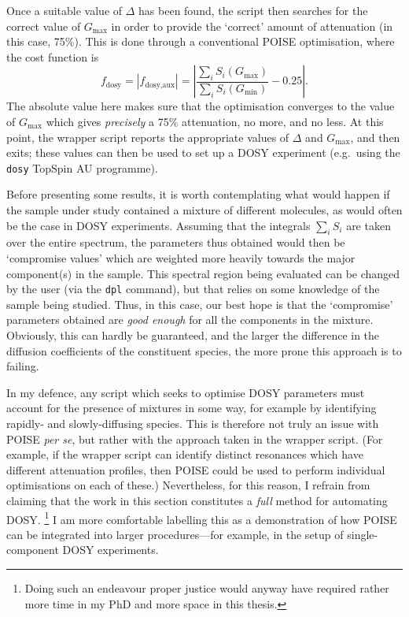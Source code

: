Once a suitable value of $\Delta$ has been found, the script then searches for the correct value of $G_\text{max}$ in order to provide the `correct' amount of attenuation (in this case, 75\%).
This is done through a conventional POISE optimisation, where the cost function is
\begin{equation}
    \label{eq:dosy_cf}
    f_\text{dosy} = |f_\text{dosy,aux}| = \left| \frac{\sum_i S_i(G_\text{max})}{\sum_i S_i(G_\text{min})} - 0.25 \right|.
\end{equation}
The absolute value here makes sure that the optimisation converges to the value of $G_\text{max}$ which gives \textit{precisely} a 75\% attenuation, no more, and no less.
At this point, the wrapper script reports the appropriate values of $\Delta$ and $G_\text{max}$, and then exits; these values can then be used to set up a DOSY experiment (e.g.\ using the \texttt{dosy} TopSpin AU programme).

Before presenting some results, it is worth contemplating what would happen if the sample under study contained a mixture of different molecules, as would often be the case in DOSY experiments.
Assuming that the integrals $\sum_i S_i$ are taken over the entire spectrum, the parameters thus obtained would then be `compromise values' which are weighted more heavily towards the major component(s) in the sample.
This spectral region being evaluated can be changed by the user (via the \texttt{dpl} command), but that relies on some knowledge of the sample being studied.
Thus, in this case, our best hope is that the `compromise' parameters obtained are \textit{good enough} for all the components in the mixture.
Obviously, this can hardly be guaranteed, and the larger the difference in the diffusion coefficients of the constituent species, the more prone this approach is to failing.

In my defence, any script which seeks to optimise DOSY parameters must account for the presence of mixtures in some way, for example by identifying rapidly- and slowly-diffusing species.
This is therefore not truly an issue with POISE \textit{per se}, but rather with the approach taken in the wrapper script.
(For example, if the wrapper script can identify distinct resonances which have different attenuation profiles, then POISE could be used to perform individual optimisations on each of these.)
Nevertheless, for this reason, I refrain from claiming that the work in this section constitutes a \textit{full} method for automating DOSY.%
\footnote{Doing such an endeavour proper justice would anyway have required rather more time in my PhD and more space in this thesis.}
I am more comfortable labelling this as a demonstration of how POISE can be integrated into larger procedures---for example, in the setup of single-component DOSY experiments.


